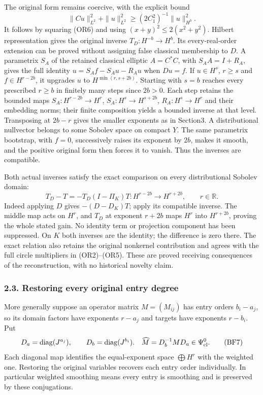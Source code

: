 \documentclass[
  11pt,
]{article}
\begin{document}
The original form remains coercive, with the explicit bound \[
 \|Cu\|_{L^2}^2+\|u\|_{L^2}^2
 \geq(2C_1^2)^{-1}\|u\|_{H^b}^2.
 \tag{OR14}
\] It follows by squaring (OR6) and using \((x+y)^2\leq2(x^2+y^2)\).
Hilbert representation gives the original inverse \(T_D:H^{-b}\to H^b\).
Its every-real-order extension can be proved without assigning false
classical membership to \(D\). A parametrix \(S_A\) of the retained
classical elliptic \(A=C^*C\), with \(S_AA=I+R_A\), gives the full
identity \(u=S_Af-S_Au-R_Au\) when \(Du=f\). If \(u\in H^s\),
\(r\geq s\) and \(f\in H^{r-2b}\), it upgrades \(u\) to
\(H^{\min(r,s+2b)}\). Starting with \(s=b\) reaches every prescribed
\(r\geq b\) in finitely many steps since \(2b>0\). Each step retains the
bounded maps \(S_A:H^{r-2b}\to H^r\), \(S_A:H^s\to H^{s+2b}\),
\(R_A:H^s\to H^r\) and their embedding norms; their finite composition
yields a bounded inverse at that level. Transposing at \(2b-r\) gives
the smaller exponents as in Section3. A distributional nullvector
belongs to some Sobolev space on compact \(Y\). The same parametrix
bootstrap, with \(f=0\), successively raises its exponent by \(2b\),
makes it smooth, and the positive original form then forces it to
vanish. Thus the inverses are compatible.

Both actual inverses satisfy the exact comparison on every
distributional Sobolev domain: \[
 T_D-T=-T_D(I-\Pi_K)T:
 H^{r-2b}\longrightarrow H^{r+2b},\qquad r\in\mathbb R.
 \tag{OR15}
\] Indeed applying \(D\) gives \(- (D-D_K)T\); apply its compatible
inverse. The middle map acts on \(H^r\), and \(T_D\) at exponent
\(r+2b\) maps \(H^r\) into \(H^{r+2b}\), proving the whole stated gain.
No identity term or projection component has been suppressed. On \(K\)
both inverses are the identity; the difference is zero there. The exact
relation also retains the original nonkernel contribution and agrees
with the full circle multipliers in (OR2)--(OR5). These are proved
receiving consequences of the reconstruction, with no historical novelty
claim.

\subsubsection{2.3. Restoring every original entry
degree}\label{restoring-every-original-entry-degree}

More generally suppose an operator matrix \(M=(M_{ij})\) has entry
orders \(b_i-a_j\), so its domain factors have exponents \(r-a_j\) and
targets have exponents \(r-b_i\). Put \[
 D_a=\operatorname{diag}(J^{a_j}),\qquad
 D_b=\operatorname{diag}(J^{b_i}).
 \quad\widehat M=D_b^{-1}MD_a\in\Psi^0_{\rm cl}.
 \tag{BF7}
\] Each diagonal map identifies the equal-exponent space
\(\bigoplus H^r\) with the weighted one. Restoring the original
variables recovers each entry order individually. In particular weighted
smoothing means every entry is smoothing and is preserved by these
conjugations.
\end{document}
